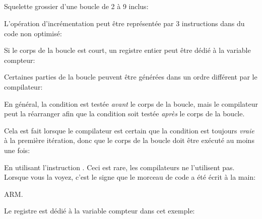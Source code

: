 ﻿%
\subsection{\Conclusion{}}

Squelette grossier d'une boucle de 2 à 9 inclus:



L'opération d'incrémentation peut être représentée par 3 instructions dans du code
non optimisé:



Si le corps de la boucle est court, un registre entier peut être dédié à la variable
compteur:



Certaines parties de la boucle peuvent être générées dans un ordre différent par
le compilateur:



En général, la condition est testée \emph{avant} le corps de la boucle, mais le compilateur
peut la réarranger afin que la condition soit testée \emph{après} le corps de la boucle.

Cela est fait lorsque le compilateur est certain que la condition est toujours \emph{vraie}
à la première itération, donc que le corps de la boucle doit être exécuté au moins
une fois:




En utilisant l'instruction . Ceci est rare, les compilateurs ne l'utilisent
pas.
Lorsque vous la voyez, c'est le signe que le morceau de code a été écrit à la main:



ARM. 

Le registre  est dédié à la variable compteur dans cet exemple:




